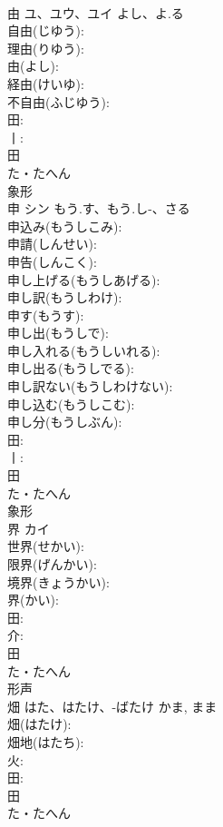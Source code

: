 \documentclass[8pt]{extreport}
\begin{document}
\begin{CJK}{UTF8}{min}
\\	由	ユ、ユウ、ユイ	よし、よ.る		
\\	自由(じゆう): 
\\	理由(りゆう): 
\\	由(よし): 
\\	経由(けいゆ): 
\\	不自由(ふじゆう): 
\\	田: 
\\	丨: 
\\	田	
\\	た・たへん	
\\	象形 
\\	申	シン	もう.す、もう.し-、さる		
\\	申込み(もうしこみ): 
\\	申請(しんせい): 
\\	申告(しんこく): 
\\	申し上げる(もうしあげる): 
\\	申し訳(もうしわけ): 
\\	申す(もうす): 
\\	申し出(もうしで): 
\\	申し入れる(もうしいれる): 
\\	申し出る(もうしでる): 
\\	申し訳ない(もうしわけない): 
\\	申し込む(もうしこむ): 
\\	申し分(もうしぶん): 
\\	田: 
\\	丨: 
\\	田	
\\	た・たへん	
\\	象形 
\\	界	カイ			
\\	世界(せかい): 
\\	限界(げんかい): 
\\	境界(きょうかい): 
\\	界(かい): 
\\	田: 
\\	介: 
\\	田	
\\	た・たへん	
\\	形声 
\\	畑		はた、はたけ、-ばたけ	かま, まま	
\\	畑(はたけ): 
\\	畑地(はたち): 
\\	火: 
\\	田: 
\\	田	
\\	た・たへん	

\end{CJK}
\end{document}
